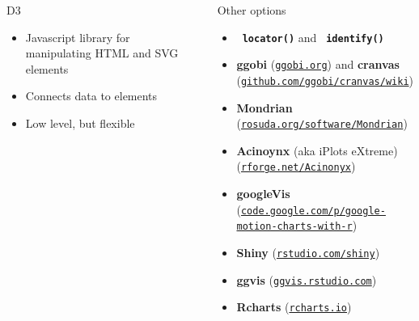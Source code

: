 \documentclass[final,plain]{beamer}
\newlength{\sepwid}
\newlength{\onecolwid}
\newcommand{\bi}{\begin{itemize}}
\newcommand{\ei}{\end{itemize}}
\newcommand{\ttsm}{\tt \small}
\newcommand{\bluebold}{\color{dblue} \bf}
\newcommand{\colonevsep}{\vspace{18.5mm}}
\begin{document}
\begin{frame}[t]
\begin{columns}[t]
\begin{column}{\onecolwid}
  \colonevsep %

    \begin{block}{D3}{

       \bi \itemsep18pt
       \item Javascript library for manipulating HTML and SVG elements
       \item Connects data to elements
       \item Low level, but flexible
       \ei
    }
    \end{block}

  \end{column}

  \begin{column}{\sepwid} \end{column} %

  \begin{column}{\onecolwid}

    \begin{block}{Other options}{

      \bi \itemsep18pt
      \item {\tt \bluebold locator()} and {\tt \bluebold identify()}
      \item {\bluebold ggobi} {\small (\href{http://ggobi.org}{\ttsm ggobi.org})} and
        {\bluebold cranvas}
        {\small (\href{https://github.com/ggobi/cranvas/wiki}{\ttsm github.com/ggobi/cranvas/wiki})}
      \item {\bluebold Mondrian}
        {\small (\href{http://rosuda.org/software/Mondrian/}{\ttsm rosuda.org/software/Mondrian})}
      \item {\bluebold Acinoynx} (aka iPlots eXtreme)
        {\small (\href{http://rforge.net/Acinonyx/}{\ttsm rforge.net/Acinonyx})}
      \item {\bluebold googleVis}
        {\small (\href{https://code.google.com/p/google-motion-charts-with-r/}{\ttsm code.google.com/p/google-motion-charts-with-r})}
      \item {\bluebold Shiny}
        {\small (\href{http://www.rstudio.com/shiny}{\ttsm rstudio.com/shiny})}
      \item {\bluebold ggvis}
        {\small (\href{http://ggvis.rstudio.com}{\ttsm ggvis.rstudio.com})}
      \item {\bluebold Rcharts}
        {\small (\href{http://rcharts.io}{\ttsm rcharts.io})}
      \ei

    }

    \end{block}


\end{column}
\end{columns}
\end{frame}
\end{document}
